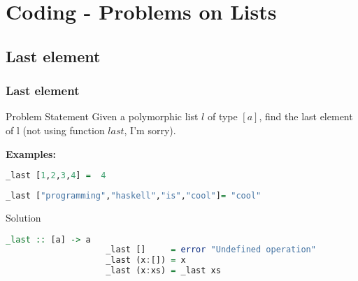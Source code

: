 \section{Coding - Problems on Lists}
\frame{\sectionpage}

\subsection{Last element}
\begin{frame}[fragile]\frametitle{Last element}


\begin{block}{Problem Statement}
			Given a polymorphic list $l$ of type $[a]$, find the last element of l
			(not using function $last$, I'm sorry).
\end{block}	
\textbf{Examples:}
		\begin{lstlisting}[language=Haskell]
					_last [1,2,3,4] =  4 
		\end{lstlisting} 
		\pause
		\begin{lstlisting}[language=Haskell]
					_last ["programming","haskell","is","cool"]= "cool" 
		\end{lstlisting}
					
\pause \pause
\begin{alertblock}{Solution}
			\begin{lstlisting}[language=Haskell]
					_last :: [a] -> a
					_last [] 	 = error "Undefined operation"
					_last (x:[]) = x
					_last (x:xs) = _last xs 
		\end{lstlisting}
\end{alertblock}	

\end{frame}

